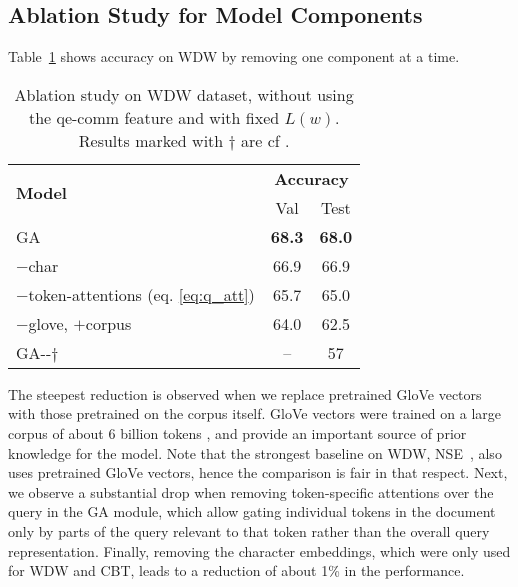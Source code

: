 \documentclass[11pt,a4paper]{article}
\begin{document}
\subsection{Ablation Study for Model Components}
\label{app:ablation}
Table~\ref{tab:ablation} shows accuracy on WDW by removing one component at a time.
\begin{table}[!htbp]
\centering
\caption{\small Ablation study on WDW dataset, without using the qe-comm feature and with fixed $L(w)$. Results marked with $\dagger$ are cf \citet{onishi2016did}.}
\label{tab:ablation}
\begin{tabular}{@{}l|c|c@{}}
\toprule
\multirow{2}{*}{\textbf{Model}} & \multicolumn{2}{c}{\textbf{Accuracy}} \\ \cmidrule(l){2-3} 
                                          & Val                & Test              \\ \midrule
GA                                       & \textbf{68.3}               & \textbf{68.0}             \\
\quad $-$char                               & 66.9               & 66.9              \\
\quad $-$token-attentions (eq. \ref{eq:q_att})  & 65.7               & 65.0              \\
\quad $-$glove, $+$corpus                & 64.0               & 62.5              \\
 \midrule
GA-{}-$\dagger$                & --               & 57              \\ \bottomrule
\end{tabular}
\end{table}
The steepest reduction is observed when we replace pretrained GloVe vectors with those pretrained on the corpus itself. GloVe vectors were trained on a large corpus of about 6 billion tokens \citep{pennington2014glove}, and provide an important source of prior knowledge for the model. Note that the strongest baseline on WDW, NSE~\citep{munkhdalai2016reasoning}, also uses pretrained GloVe vectors, hence the comparison is fair in that respect. Next, we observe a substantial drop when removing token-specific attentions over the query in the GA module, which allow gating individual tokens in the document only by parts of the query relevant to that token rather than the overall query representation. Finally, removing the character embeddings, which were only used for WDW and CBT, leads to a reduction of about 1\% in the performance. 
\end{document}
